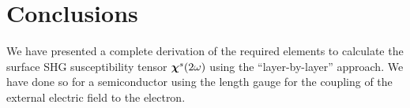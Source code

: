 \documentclass{article}
\begin{document}
\section{Conclusions}\label{con}

We have presented a complete derivation of the required elements to
calculate the surface SHG susceptibility tensor $\boldsymbol{\chi}^s(2\omega)$ 
using the ``layer-by-layer'' approach. We have done so for a
semiconductor using the 
length gauge for the coupling of the external electric field to the electron. 


\appendix
















\end{document}
